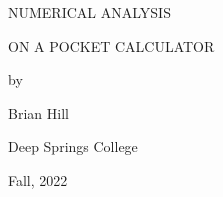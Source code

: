 
\null\vskip72pt

\centerline{\Largebf NUMERICAL ANALYSIS}

\vskip12pt

\centerline{\Largebf ON A POCKET CALCULATOR}

\vskip24pt

\centerline{\Largebf by}

\vskip24pt

\centerline{\Largebf Brian Hill}

\vskip24pt

\centerline{\Largebf Deep Springs College}

\vskip24pt

\centerline{\Largebf Fall, 2022}

\vfill

\eject
